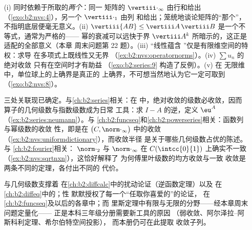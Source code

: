 \begin{remark}[常见误区]\label{rem:b2:nvs:pitfalls}
(i) 同时依赖于所取的\emph{两个}：同一
矩阵的 $\vertiii\cdot_\infty$ 由行和给出
（\cref{exo:b2:nvs:4}），另一个 $\vertiii\cdot_1$ 由列
和给出；笼统地谈论矩阵的“那个”，
不指明底层便毫无意义。(ii) $\vertiii{AB} \leq
\vertiii A\,\vertiii B$ 是一个不等式，通常为严格的——
幂的衰减可以远快于界 $\vertiii A^k$
所暗示的，这正是适配的全部意义（本章
周末问题第 22 题）。(iii) “线性蕴含
”仅是有限维空间的特权：求导
在多项式上既线性又无界
（\cref{ex:b2:nvs:operatornorms}）。(iv) $\sum u_n$ 的绝对收敛
只有在空间时才有助益
（\cref{exo:b2:series:9} 构造了反例）。(v) 在
无限维中，单位球上的上确界是真正的
上确界，不可想当然地认为它一定可取到
（\cref{exo:b2:nvs:8}）。
\end{remark}

\begin{remark}[本册内的几个视角]\label{rem:b2:nvs:perspectives}
三处关联现已确定。与\cref{ch:b2:series}相关：在
中，绝对收敛的级数必收敛，因而
算子的几何级数与指数级数成为日常
工具：求 $I - A$ 的逆，定义 $\eu^{A}$
（\cref{ex:b2:series:neumann}）。与
\cref{ch:b2:funcseq}和\cref{ch:b2:powerseries}相关：函数列与幂级数的收敛
性，即是在
$\bigl(C, \norm\cdot_\infty\bigr)$ 中的收敛
（\cref{ex:b2:nvs:uniformdictionary}），而收敛半径
是关于哪些几何级数占优的陈述。与
\cref{ch:b2:fourier}相关：
$\norm\cdot_2$ 与 $\norm\cdot_\infty$ 在
$C(\intcc{0}{1})$ 上确实不一致（\cref{ex:b2:nvs:sqrtnxn}），这恰好解释了
为何傅里叶级数的均方收敛与一致
收敛是两条不同的定理，各付出不同的
代价。
\end{remark}

\begin{remark}[本章的应用]
与几何级数支撑着
在\cref{ch:b2:diffcalc}中的扰动论证（逆函数定理）以及
在\cref{ch:b2:diffeq}中的；性
默默授权了每一个“任取你喜爱的”的论证，
在\cref{ch:b2:funcseq}及以后的各章中；而
里斯定理中有限与无限的分野——经本章周末问题定量化——
正是本科三年级分册需要新工具的原因
（弱收敛、阿尔泽拉–阿斯科利定理、希尔伯特空间投影），
而本册仍可在此提取
收敛子列。
\end{remark}

